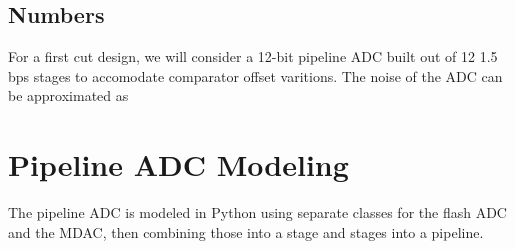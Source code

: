 \documentclass[11pt]{article}
\begin{document}
\subsection{Numbers}
For a first cut design, we will consider a 12-bit pipeline ADC built out of 12 1.5 bps stages to accomodate comparator offset varitions.
The noise of the ADC can be approximated as 

\section{Pipeline ADC Modeling}
The pipeline ADC is modeled in Python using separate classes for the flash ADC and the MDAC, then combining those into a stage and stages into a pipeline.
\end{document}
